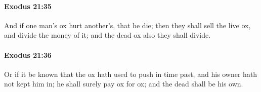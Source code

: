 		\paragraph{Exodus 21:35} %
			\label{EXODUS-21-35}

			And if one man's ox hurt another's, that he die; then they shall sell the live ox, and divide the money of it; and the dead ox also they shall divide.


		\paragraph{Exodus 21:36} %
			\label{EXODUS-21-36}

			Or if it be known that the ox hath used to push in time past, and his owner hath not kept him in; he shall surely pay ox for ox; and the dead shall be his own.

